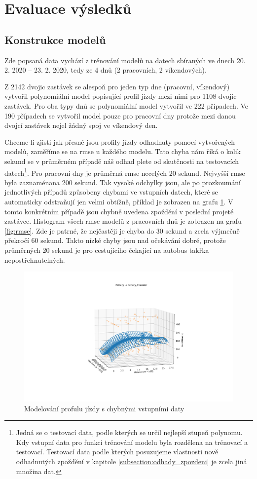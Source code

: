 \section{Evaluace výsledků}

\subsection{Konstrukce modelů}

Zde popsaná data vychází z trénování modelů na datech sbíraných ve dnech 20. 2. 2020 -- 23. 2. 2020, tedy ze 4 dnů (2 pracovních, 2 víkendových).

\bigbreak

Z 2142 dvojic zastávek se alespoň pro jeden typ dne (pracovní, víkendový) vytvořil polynomiální model popisující profil jízdy mezi nimi pro 1108 dvojic zastávek. Pro oba typy dnů se polynomiální model vytvořil ve 222 případech. Ve 190 případech se vytvořil model pouze pro pracovní dny protože mezi danou dvojcí zastávek nejel žádný spoj ve víkendový den.

\bigbreak

Chceme-li zjisti jak přesně jsou profily jízdy odhadnuty pomocí vytvořených modelů, zaměříme se na \gls{rmse} u každého modelu. Tato chyba nám říká o kolik sekund se v průměrném případě náš odhad plete od skutčnosti na testovacích datech\footnote{Jedná se o testovací data, podle kterých se určil nejlepší stupeň polynomu. Kdy vstupní data pro funkci trénování modelu byla rozdělena na trénovací a testovací. Testovací data podle kterých posuzujeme vlastnosti nově odhadnutých zpoždění v kapitole \ref{subsection:odhady_zpozdeni} je zcela jiná množina dat.}. Pro pracovní dny je průměrná \gls{rmse} necelých 20 sekund. Nejvyšší \gls{rmse} byla zaznaménana 200 sekund. Tak vysoké odchylky jsou, ale po prozkoumání jednotlivých případů způsobeny chybami ve vstupních datech, které se automaticky odstraňují jen velmi obtížně, příklad je zobrazen na grafu \ref{fig:chyba_zpozdeni_v_posledni_zastavce}. V tomto konkrétním případě jsou chybně uvedena zpoždění v poslední projeté zastávce. Histogram všech \gls{rmse} modelů z pracovních dnů je zobrazen na grafu \ref{fig:rmse}. Zde je patrné, že nejčastěji je chyba do 30 sekund a zcela výjmečně překročí 60 sekund. Takto nízké chyby jsou nad očekávání dobré, protože průměrných 20 sekund je pro cestujícího čekající na autobus takřka nepostřehnutelných.

\begin{figure}
	\centering
  \includegraphics[width=0.4\linewidth]{../img/chyba_zpozdeni_v_posledni_zastavce.png}
  \caption{Modelování profulu jízdy s chybnými vstupními daty}
  \label{fig:chyba_zpozdeni_v_posledni_zastavce}
\end{figure}

